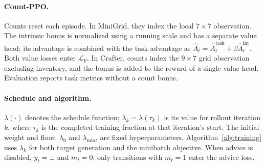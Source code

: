 \paragraph{Count-PPO.}
Counts reset each episode. In MiniGrid, they index the local
$7\times7$ observation. The intrinsic bonus is normalized using
a running scale and has a separate value head; its advantage is
combined with the task advantage as
$\hat{A}_t=\hat{A}^{\mathrm{task}}_t+
\beta\hat{A}^{\mathrm{int}}_t$.
Both value losses enter $\mathcal{L}_V$.
In Crafter, counts index the $9\times7$ grid observation excluding
inventory, and the bonus is added to the reward of a single value
head. Evaluation reports task metrics without a count bonus.

\paragraph{Schedule and algorithm.}
$\lambda(\cdot)$ denotes the schedule function;
$\lambda_k=\lambda(\tau_k)$ is its value for rollout iteration $k$,
where $\tau_k$ is the completed training fraction at that iteration's start.
The initial weight and floor, $\lambda_0$ and $\lambda_{\min}$, are
fixed hyperparameters. Algorithm~\ref{alg:training} uses $\lambda_k$
for both target generation and the minibatch objective.
When advice is disabled, $y_t=\bot$ and $m_t=0$; only transitions
with $m_t=1$ enter the advice loss.


